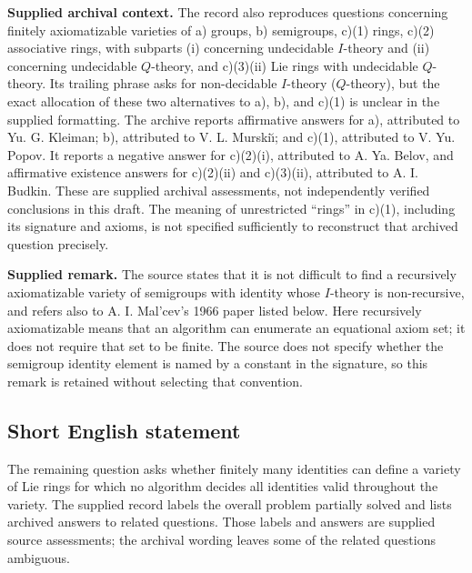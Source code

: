 \documentclass[11pt]{article}
\begin{document}
\textbf{Supplied archival context.} The record also reproduces questions concerning finitely axiomatizable varieties of a) groups, b) semigroups, c)(1) rings, c)(2) associative rings, with subparts (i) concerning undecidable \(I\)-theory and (ii) concerning undecidable \(Q\)-theory, and c)(3)(ii) Lie rings with undecidable \(Q\)-theory. Its trailing phrase asks for non-decidable \(I\)-theory (\(Q\)-theory), but the exact allocation of these two alternatives to a), b), and c)(1) is unclear in the supplied formatting. The archive reports affirmative answers for a), attributed to Yu. G. Kleiman; b), attributed to V. L. Murski\u\i; and c)(1), attributed to V. Yu. Popov. It reports a negative answer for c)(2)(i), attributed to A. Ya. Belov, and affirmative existence answers for c)(2)(ii) and c)(3)(ii), attributed to A. I. Budkin. These are supplied archival assessments, not independently verified conclusions in this draft. The meaning of unrestricted ``rings'' in c)(1), including its signature and axioms, is not specified sufficiently to reconstruct that archived question precisely.

\textbf{Supplied remark.} The source states that it is not difficult to find a recursively axiomatizable variety of semigroups with identity whose \(I\)-theory is non-recursive, and refers also to A. I. Mal'cev's 1966 paper listed below. Here recursively axiomatizable means that an algorithm can enumerate an equational axiom set; it does not require that set to be finite. The source does not specify whether the semigroup identity element is named by a constant in the signature, so this remark is retained without selecting that convention.
\subsection{Short English statement}
The remaining question asks whether finitely many identities can define a variety of Lie rings for which no algorithm decides all identities valid throughout the variety. The supplied record labels the overall problem partially solved and lists archived answers to related questions. Those labels and answers are supplied source assessments; the archival wording leaves some of the related questions ambiguous.
\end{document}
